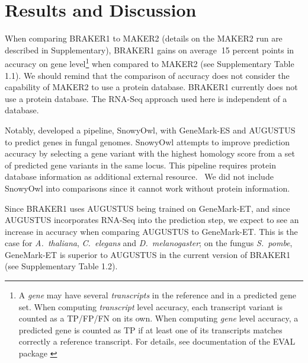 \documentclass{bioinfo}
\begin{document}
\section{Results and Discussion}

When comparing BRAKER1 to MAKER2 (details on the MAKER2 run are described in Supplementary), BRAKER1 gains on average $~$15 percent points in accuracy on gene level\footnote{A \textit{gene} may have several \textit{transcripts} in the reference and in a predicted gene set. When computing \textit{transcript} level accuracy, each transcript variant is counted as a TP/FP/FN on its own. When computing \textit{gene} level accuracy, a predicted gene is counted as TP if at least one of its transcripts matches correctly a reference transcript. For details, see documentation of the EVAL package \citep{Eval}} when compared to MAKER2 (see Supplementary Table 1.1).
We should remind that the comparison of accuracy does not consider the capability of MAKER2 to use a protein database. BRAKER1 currently does not use a protein database. 
The RNA-Seq approach used here is independent of a database.

Notably, \citet{SnowyOwl} developed a pipeline, SnowyOwl, with GeneMark-ES \cite{GeneMark-ES} and AUGUSTUS to predict genes in fungal genomes. SnowyOwl attempts to improve prediction accuracy by selecting a gene variant with the highest homology score from a set of predicted gene variants in the same locus. This pipeline requires protein database information as additional external resource.  We did not include SnowyOwl into comparisons since it cannot work without protein information.%

Since BRAKER1 uses AUGUSTUS being trained on GeneMark-ET, and since AUGUSTUS incorporates RNA-Seq into the prediction step, we expect to see an increase in accuracy when comparing AUGUSTUS to GeneMark-ET. This is the case for \textit{A.~thaliana}, \textit{C.~elegans} and \textit{D.~melanogaster}; on the fungus \textit{S.~pombe}, GeneMark-ET is superior to AUGUSTUS in the current version of BRAKER1 (see Supplementary Table 1.2). 
\end{document}
